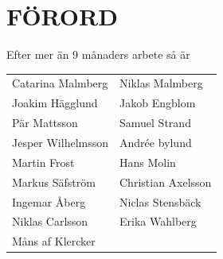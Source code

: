 \documentclass[a6paper,fontsize=10pt,twoside,open=right]{scrbook}
\begin{document}
\section{FÖRORD}\vspace{10pt}
\hspace{10pt} Efter mer än 9 månaders arbete så är\par
\noindent
\begin{tabular}{@{}p{}p{}@{}}
  Catarina Malmberg & Niklas Malmberg\\
  Joakim Hägglund & Jakob Engblom\\
  Pär Mattsson & Samuel Strand\\
  Jesper Wilhelmsson & Andrée bylund\\
  Martin Frost & Hans Molin\\
  Markus Säfström & Christian Axelsson\\
  Ingemar Åberg & Niclas Stensbäck\\
  Niklas Carlsson & Erika Wahlberg\\
  Måns af Klercker &
\end{tabular}\par
\cleardoublepage
\end{document}

